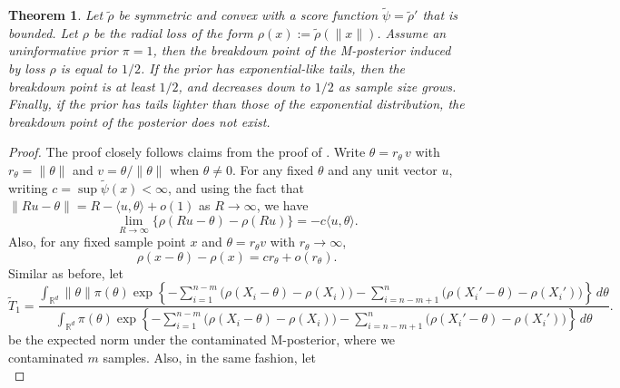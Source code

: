 \documentclass[11pt, oneside]{amsart}
\newtheorem{theorem}{Theorem}[]
\theoremstyle{definition}   %
\newcommand{\R}{\mathbb{R}}
\newcommand{\loss}{\rho}
\begin{document}
\begin{theorem} \label{thm::convex-loss-higher-dim}
    Let $\widetilde \rho$ be symmetric and convex with a score function $\widetilde\psi = {\widetilde\rho}'$ that is bounded. Let \( \loss \) be the radial loss of the form \( \loss(x) := \widetilde \loss (\| x\|)\). Assume an uninformative prior \( \pi = 1\), then the breakdown point of the M-posterior induced by loss \(\rho\) is equal to \( 1/2\). If the prior has exponential-like tails, then the breakdown point is at least \( 1/2\), and decreases down to \( 1/2\) as sample size grows. Finally, if the prior has tails lighter than those of the exponential distribution, the breakdown point of the posterior does not exist.
\end{theorem}
%
\begin{proof}
    The proof closely follows claims from the proof of .
    Write $\theta = r_\theta\,v$ with $r_\theta=\|\theta\|$ and $v=\theta/\|\theta\|$ when $\theta\neq 0$.
    For any fixed $\theta$ and any unit vector $u$, writing \( c = \sup \widetilde \psi (x) < \infty\), and using the fact that $\|Ru-\theta\|=R-\langle u,\theta\rangle+o(1)$ as $R\to\infty$, we have
    \begin{equation} \label{eqn::multiple-d-limit-in-x}
        \lim_{R\to\infty}\big\{\rho(Ru-\theta)-\rho(Ru)\big\} = - c \langle u,\theta\rangle.
    \end{equation}
    Also, for any fixed sample point $x$ and $\theta=r_\theta v$ with $r_\theta\to\infty$,
    \begin{equation} \label{eqn::multiple-d-limit-in-theta}
        \rho(x-\theta)-\rho(x)
        =
        c r_\theta + o(r_\theta).
    \end{equation}
    Similar as before, let 
    \begin{equation*}
        \widetilde T_1 = \frac{\int_{\R^d} \| \theta \| \pi(\theta) \exp \left \{-\sum_{i=1}^{n-m} \bigl ( \loss(X_i - \theta) - \loss(X_i) \bigr ) - \sum_{i=n - m +1}^{n} \bigl ( \loss(X_i' - \theta) - \loss(X_i') \bigr ) \right \} \, d\theta}{\int_{\R^d} \pi(\theta) \exp \left \{-\sum_{i=1}^{n-m} \bigl ( \loss(X_i - \theta) - \loss(X_i) \bigr ) - \sum_{i=n - m +1}^{n} \bigl ( \loss(X_i' - \theta) - \loss(X_i') \bigr ) \right \} \, d\theta}.
    \end{equation*}
    be the expected norm under the contaminated M-posterior, where we contaminated \( m \) samples. Also, in the same fashion, let
        \begin{equation*}

\end{equation*}
\end{proof}
\end{document}
